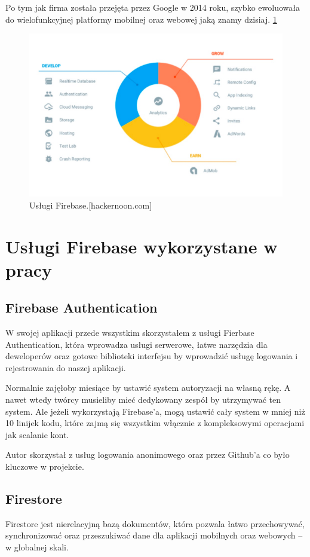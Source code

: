 Po tym jak firma została przejęta przez Google w 2014 roku,
szybko ewoluowała do wielofunkcyjnej platformy mobilnej oraz webowej jaką znamy dzisiaj.
\ref{rys:firebase}

\begin{figure}
\centering\includegraphics[width=.6\textwidth]{img/firebase}
\caption{Usługi Firebase.[hackernoon.com]}\label{rys:firebase}%
\end{figure}

\section{Usługi Firebase wykorzystane w pracy}

\subsection{Firebase Authentication}

W swojej aplikacji przede wszystkim skorzystałem z usługi Fierbase Authentication,
która wprowadza usługi serwerowe,
łatwe narzędzia dla deweloperów oraz gotowe biblioteki interfejsu by wprowadzić usługę logowania i rejestrowania do naszej aplikacji.

Normalnie zajęłoby miesiące by ustawić system autoryzacji na własną rękę.
A nawet wtedy twórcy musieliby mieć dedykowany zespół by utrzymywać ten system.
Ale jeżeli wykorzystają Firebase’a, mogą ustawić cały system w mniej niż 10 linijek kodu,
które zajmą się wszystkim włącznie z kompleksowymi operacjami jak scalanie kont.

Autor skorzystał z usług logowania anonimowego oraz przez Github’a co było kluczowe w projekcie.

\subsection{Firestore}

Firestore jest nierelacyjną bazą dokumentów, która pozwala łatwo przechowywać,
synchronizować oraz przeszukiwać dane dla aplikacji mobilnych oraz webowych – w globalnej skali.

